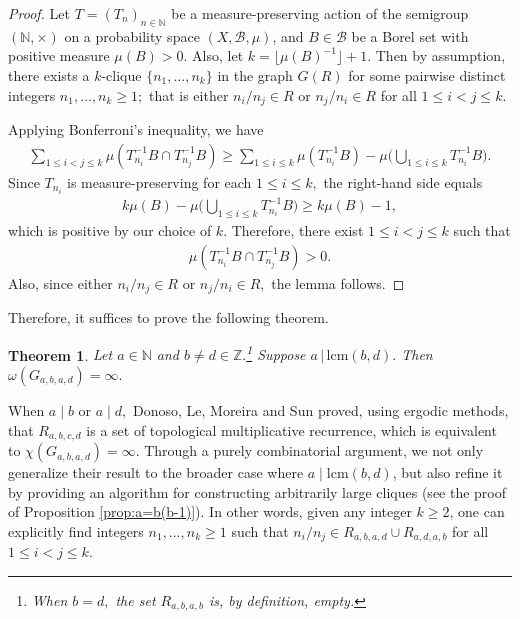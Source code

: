 \documentclass[12pt, reqno, a4paper]{amsart}
\newtheorem{theorem}{Theorem}[section]
\theoremstyle{definition}
\theoremstyle{remark}
\numberwithin{equation}{section}
\renewcommand{\leq}{\leqslant}
\renewcommand{\geq}{\geqslant}
\begin{document}
\begin{proof}
Let \( T = (T_n)_{n \in \mathbb{N}} \) be a measure-preserving action of the semigroup \( (\mathbb{N}, \times) \) on a probability space \( (X, \mathcal{B}, \mu) \), and \( B \in \mathcal{B} \) be a Borel set with positive measure \( \mu(B) > 0 \). Also, let $k=\lfloor \mu(B)^{-1} \rfloor+1.$ Then by assumption, there exists a $k$-clique $\{ n_1, \ldots, n_k\}$ in the graph $G(R)$ for some pairwise distinct integers $n_1, \ldots, n_k \geq 1;$ that is either $n_i/n_j \in R$ or $n_j/n_i \in R$ for all $1 \leq i < j \leq k.$ 

Applying Bonferroni's inequality, we have
\begin{align*}
\sum_{1 \leq i <j \leq k} \mu(T^{-1}_{n_i} B \cap T^{-1}_{n_j} B)
\geq \sum_{1 \leq i \leq k} \mu(T^{-1}_{n_i} B) -\mu \bigg( \bigcup_{1 \leq i \leq k} T^{-1}_{n_i} B \bigg).
\end{align*}
Since $T_{n_i}$ is measure-preserving for each $1 \leq i \leq k,$ the right-hand side equals
\begin{align*}
k\mu(B) -\mu \bigg( \bigcup_{1 \leq i \leq k} T^{-1}_{n_i} B \bigg)
\geq k\mu(B)-1,
\end{align*}
which is positive by our choice of $k.$ Therefore, there exist $1 \leq i< j \leq k$ such that
\begin{align*}
\mu(T^{-1}_{n_i} B \cap T^{-1}_{n_j} B)>0.
\end{align*}
Also, since either $n_i/n_j \in R$ or $n_j/n_i \in R,$ the lemma follows.
\end{proof}

Therefore, it suffices to prove the following theorem.

\begin{theorem} \label{thm:suff}
Let $a \in \mathbb{N}$ and $b \neq d \in \mathbb{Z}.$\footnote{When $b=d,$ the set $R_{a,b,a,b}$ is, by definition, empty.}
Suppose $a \, | \, \mathrm{lcm}(b,d).$ Then $\omega(G_{a,b,a,d})=\infty.$
\end{theorem}

When $a \mid b$ or $a \mid d,$ Donoso, Le, Moreira and Sun \cite[Proposition 3.6]{MR4594405} proved,  using ergodic methods, that $R_{a,b,c,d}$ is a set of topological multiplicative recurrence, which is equivalent to $\chi(G_{a,b,a,d})=\infty$. Through a purely combinatorial argument, we not only generalize their result to the broader case where \( a \mid \mathrm{lcm}(b,d) \), but also refine it by providing an algorithm for constructing arbitrarily large cliques (see the proof of Proposition \ref{prop:a=b(b-1)}). In other words, given any integer \( k \geq 2 \), one can explicitly find integers \( n_1, \ldots, n_k \geq 1 \) such that \( n_i / n_j \in R_{a,b,a,d} \cup R_{a,d,a,b} \) for all \( 1 \leq i < j \leq k \).
\end{document}
